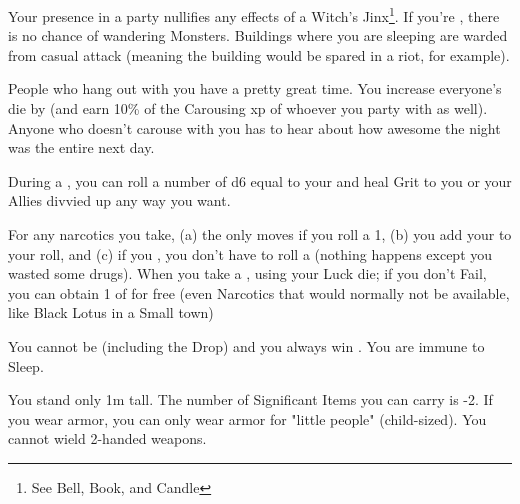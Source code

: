 {    

  
    Your presence in a party nullifies any effects of a Witch's Jinx\footnote{See Bell, Book, and Candle}.  If you're , there is no chance of wandering Monsters. Buildings where you are sleeping are warded from casual attack (meaning the building would be spared in a riot, for example). 

  
    People who hang out with you have a pretty great time.  You increase everyone's  die by \DCUP (and earn 10\% of the Carousing xp of whoever you party with as well). Anyone who doesn't carouse with you has to hear about how awesome the night was the entire next day.    

  
    During a , you can roll a number of d6 equal to your \LVL and heal \SUM Grit to you or your Allies divvied up any way you want.  


    For any narcotics you take, (a) the \UD only moves \DCDOWN if you roll a 1, (b) you add your \LVL to your  roll, and (c) if you , you don't have to roll a  (nothing happens except you wasted some drugs).  When you take a , \RS using your Luck die; if you don't Fail, you can obtain 1 \UD of   for free (even Narcotics that would normally not be available, like Black Lotus in a Small town)

  
    You cannot be  (including the Drop) and you always win .  You are immune to Sleep.




    You stand only 1m tall.  The number of Significant Items you can carry is -2. If you wear armor, you can only wear armor for "little people" (child-sized).  You cannot wield 2-handed weapons.

}
